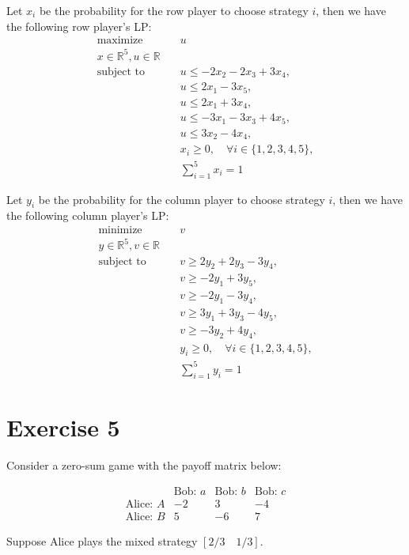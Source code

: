 \documentclass{article}
\begin{document}
Let $x_i$ be the probability for the row player to choose strategy $i$, then we have the following row player's LP:
\begin{align*}
\text{maximize} & \quad u \\
x \in \mathbb{R}^5, u \in \mathbb{R} & \\
\text{subject to} & \quad u \leq -2x_2 - 2x_3 + 3x_4, \\
& \quad u \leq 2x_1 - 3x_5, \\
& \quad u \leq 2x_1 + 3x_4, \\
& \quad u \leq -3x_1 - 3x_3 + 4x_5, \\
& \quad u \leq 3x_2 - 4x_4, \\
& \quad x_i \geq 0, \quad \forall i \in \{1,2,3,4,5\}, \\
& \quad \sum_{i=1}^5 x_i = 1
\end{align*}

Let $y_i$ be the probability for the column player to choose strategy $i$, then we have the following column player's LP:
\begin{align*}
\text{minimize} & \quad v \\
y \in \mathbb{R}^5, v \in \mathbb{R} & \\
\text{subject to} & \quad v \geq 2y_2 + 2y_3 - 3y_4, \\
& \quad v \geq -2y_1 + 3y_5, \\
& \quad v \geq -2y_1 - 3y_4, \\
& \quad v \geq 3y_1 + 3y_3 - 4y_5, \\
& \quad v \geq -3y_2 + 4y_4, \\
& \quad y_i \geq 0, \quad \forall i \in \{1,2,3,4,5\}, \\
& \quad \sum_{i=1}^5 y_i = 1
\end{align*}

\newpage

\section*{Exercise 5}
Consider a zero-sum game with the payoff matrix below:

$$\begin{array}{c|ccc}
& \text{Bob: } a & \text{Bob: } b & \text{Bob: } c \\
\hline
\text{Alice: } A & -2 & 3 & -4 \\
\text{Alice: } B & 5 & -6 & 7
\end{array}$$

Suppose Alice plays the mixed strategy $\left[2/3 \quad 1/3\right]$. \\
\end{document}
